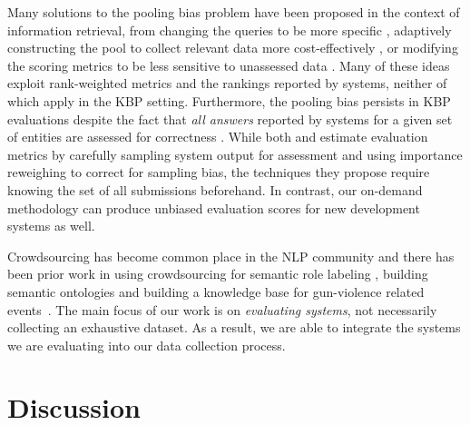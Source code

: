 Many solutions to the pooling bias problem have been proposed in the context of information retrieval, from 
  changing the queries to be more specific \citep{buckley2007bias}, 
  adaptively constructing the pool to collect relevant data more cost-effectively \citep{zobel1998reliable,cormack1998efficient,aslam2006statistical}, or
  modifying the scoring metrics to be less sensitive to unassessed data \citep{buckley2004incomplete,sakai2008information,aslam2006statistical}.
Many of these ideas exploit rank-weighted metrics and the rankings reported by systems, neither of which apply in the KBP setting. Furthermore, the pooling bias persists in KBP evaluations despite the fact that  \textit{all answers} reported by systems for a given set of entities are assessed for correctness .
While both \citet{aslam2006statistical} and \citet{yilmaz2008simple} estimate evaluation metrics by carefully sampling system output for assessment and using importance reweighing to correct for sampling bias,
  the techniques they propose require knowing the set of all submissions beforehand.
In contrast, our on-demand methodology can produce unbiased evaluation scores for new development systems as well.

Crowdsourcing has become common place in the NLP community and there has been prior work in using crowdsourcing for semantic role labeling \citep{he2015question}, building semantic ontologies \citep{vannella2014validating} and building a knowledge base for gun-violence related events~\cite{pavlick2016gun}.
The main focus of our work is on \textit{evaluating systems}, not necessarily collecting an exhaustive dataset. As a result, we are able to integrate the systems we are evaluating into our data collection process.

\section{Discussion}
\label{sec:discussion}

